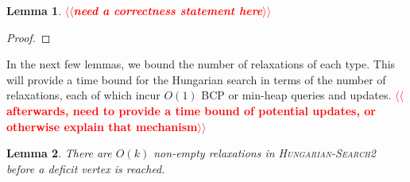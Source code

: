 \documentclass[11pt]{article}
\makeatletter
\def\eps{\varepsilon}
\theoremstyle{plain}
\newtheorem{lemma}{Lemma}[section]
\numberwithin{figure}{section}
\def\n@te#1{\textsf{\boldmath \textbf{$\langle\!\langle$#1$\rangle\!\rangle$}}\leavevmode}
\def\note#1{\textcolor{red}{\n@te{#1}}}
\makeatother
\begin{document}
\begin{lemma}
\label{lemma:empty_correct}
\note{need a correctness statement here}
\end{lemma}

\begin{proof}
\end{proof}







In the next few lemmas, we bound the number of relaxations of each type.
This will provide a time bound for the Hungarian search in terms of the
number of relaxations, each of which incur $O(1)$ BCP or min-heap queries and
updates.
\note{afterwards, need to provide a time bound of potential updates, or otherwise explain that mechanism}

\begin{lemma}
\label{lemma:goldberg_hs_length1}
There are $O(k)$ non-empty relaxations in \textsc{Hungarian-Search2} before a
deficit vertex is reached.
\end{lemma}
\end{document}
